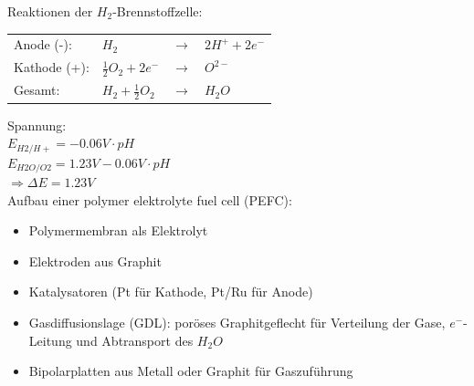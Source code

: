 Reaktionen der $H_2$-Brennstoffzelle:
\begin{table}[htbp]
	\begin{tabular}{llll}
		Anode (-): & $H_2$ & $\rightarrow$ & $2 H^+ + 2 e^-$ \\
		Kathode (+): & $\frac{1}{2} O_2 + 2 e^-$ & $\rightarrow$ & $O^{2-}$ \\ \hline
		Gesamt: & $H_2 + \frac{1}{2} O_2$ & $\rightarrow$ & $H_2O$
	\end{tabular}
\end{table}

Spannung: \\
$E_{H2/H+} = -0.06V \cdot pH$ \\
$E_{H2O/O2} = 1.23V - 0.06V \cdot pH$ \\
$\Rightarrow \Delta E = 1.23 V$ \\

Aufbau einer polymer elektrolyte fuel cell (PEFC):
\begin{itemize}
	\item Polymermembran als Elektrolyt
	\item Elektroden aus Graphit
	\item Katalysatoren (Pt für Kathode, Pt/Ru für Anode)
	\item Gasdiffusionslage (GDL): poröses Graphitgeflecht für Verteilung der Gase, $e^-$-Leitung und Abtransport des $H_2O$
	\item Bipolarplatten aus Metall oder Graphit für Gaszuführung
\end{itemize}